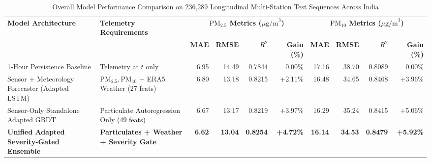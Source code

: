 \begin{table}[t]
\caption{Overall Model Performance Comparison on 236,289 Longitudinal Multi-Station Test Sequences Across India}
\label{tab:overall_benchmarks}
\centering
\small
\begin{tabular}{llrrrrrrrr}
\toprule
\textbf{Model Architecture} & \textbf{Telemetry Requirements} & \multicolumn{4}{c}{\textbf{$\text{PM}_{2.5}$ Metrics ($\mu\text{g/m}^3$)}} & \multicolumn{4}{c}{\textbf{$\text{PM}_{10}$ Metrics ($\mu\text{g/m}^3$)}} \\
\cmidrule(lr){3-6} \cmidrule(lr){7-10}
& & \textbf{MAE} & \textbf{RMSE} & \textbf{$R^2$} & \textbf{Gain (\%)} & \textbf{MAE} & \textbf{RMSE} & \textbf{$R^2$} & \textbf{Gain (\%)} \\
\midrule
1-Hour Persistence Baseline & Telemetry at $t$ only & 6.95 & 14.49 & 0.7844 & 0.00\% & 17.16 & 38.70 & 0.8089 & 0.00\% \\
Sensor + Meteorology Forecaster (Adapted LSTM) & $\text{PM}_{2.5}, \text{PM}_{10}$ + ERA5 Weather (27 feats) & 6.80 & 13.18 & 0.8215 & +2.11\% & 16.48 & 34.65 & 0.8468 & +3.96\% \\
Sensor-Only Standalone Adapted GBDT & Particulate Autoregression Only (49 feats) & 6.67 & 13.17 & 0.8219 & +3.97\% & 16.29 & 35.24 & 0.8415 & +5.06\% \\
\textbf{Unified Adapted Severity-Gated Ensemble} & \textbf{Particulates + Weather + Severity Gate} & \textbf{6.62} & \textbf{13.04} & \textbf{0.8254} & \textbf{+4.72\%} & \textbf{16.14} & \textbf{34.53} & \textbf{0.8479} & \textbf{+5.92\%} \\
\bottomrule
\end{tabular}
\end{table}
